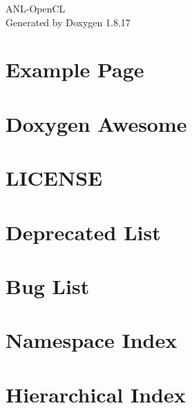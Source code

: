 \let\mypdfximage\pdfximage\def\pdfximage{\immediate\mypdfximage}\documentclass[twoside]{book}
\newcommand{\+}{\discretionary{\mbox{\scriptsize$\hookleftarrow$}}{}{}}
\newcommand{\clearemptydoublepage}{%
  \newpage{\pagestyle{empty}\cleardoublepage}%
}
\begin{document}
\hypersetup{pageanchor=false,
             bookmarksnumbered=true,
             pdfencoding=unicode
            }
\begin{titlepage}
\vspace*{7cm}
\begin{center}%
{\Large A\+N\+L-\/\+Open\+CL }\\
\vspace*{1cm}
{\large Generated by Doxygen 1.8.17}\\
\end{center}
\end{titlepage}
\clearemptydoublepage
{}
\tableofcontents
\clearemptydoublepage
{}
\hypersetup{pageanchor=true}

\chapter{Example Page}
\label{page1}

\chapter{Doxygen Awesome}
\label{md_doxygen-awesome-css_README}

\chapter{L\+I\+C\+E\+N\+SE}
\label{md_src_main_cpp_extern_RandomCL_LICENSE}

\chapter{Deprecated List}
\label{deprecated}

\chapter{Bug List}
\label{bug}

\chapter{Namespace Index}

\chapter{Hierarchical Index}

\end{document}
